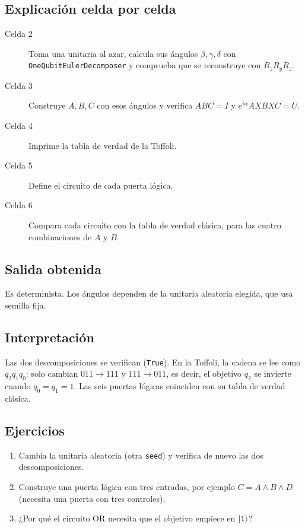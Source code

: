 \subsection{Explicación celda por celda}
\begin{description}
  \item[Celda 2] Toma una unitaria al azar, calcula sus ángulos $\beta,\gamma,\delta$
    con \texttt{OneQubitEulerDecomposer} y comprueba que se reconstruye con
    $R_zR_yR_z$.
  \item[Celda 3] Construye $A,B,C$ con esos ángulos y verifica $ABC=I$ y
    $e^{i\alpha}AXBXC=U$.
  \item[Celda 4] Imprime la tabla de verdad de la Toffoli.
  \item[Celda 5] Define el circuito de cada puerta lógica.
  \item[Celda 6] Compara cada circuito con la tabla de verdad clásica, para las
    cuatro combinaciones de $A$ y $B$.
\end{description}

\subsection{Salida obtenida}

Es determinista. Los ángulos dependen de la unitaria aleatoria elegida, que usa
semilla fija.

\subsection{Interpretación}
Las dos descomposiciones se verifican (\texttt{True}). En la Toffoli, la cadena
se lee como $q_2q_1q_0$: solo cambian $011\to111$ y $111\to011$, es decir, el
objetivo $q_2$ se invierte cuando $q_0=q_1=1$. Las seis puertas lógicas
coinciden con su tabla de verdad clásica.

\subsection{Ejercicios}
\begin{enumerate}
  \item Cambia la unitaria aleatoria (otra \texttt{seed}) y verifica de nuevo las
    dos descomposiciones.
  \item Construye una puerta lógica con tres entradas, por ejemplo $C=A\wedge B\wedge D$
    (necesita una puerta con tres controles).
  \item ¿Por qué el circuito OR necesita que el objetivo empiece en $\left|1\right\rangle$?
\end{enumerate}

